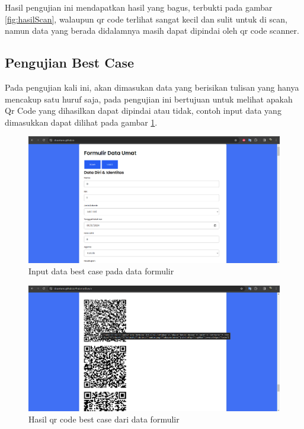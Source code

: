 Hasil pengujian ini mendapatkan hasil yang bagus, terbukti pada gambar \ref{fig:hasilScan}, walaupun qr code terlihat sangat kecil dan sulit untuk di scan, namun data yang berada didalamnya masih dapat dipindai oleh qr code scanner.

\subsection{Pengujian Best Case}
\label{sec:pengujianBest}

Pada pengujian kali ini, akan dimasukan data yang berisikan tulisan yang hanya mencakup satu huruf saja, pada pengujian ini bertujuan untuk melihat apakah Qr Code yang dihasilkan dapat dipindai atau tidak, contoh input data yang dimasukkan dapat dilihat pada gambar \ref{fig:inputBestCase}.

\begin{figure}[H]
	\centering
	\includegraphics[scale=0.4]{Gambar/inputBestCase.png}
	\caption{Input data best case pada data formulir} 
	\label{fig:inputBestCase}
\end{figure}

\begin{figure}[H]
	\centering
	\includegraphics[scale=0.4]{Gambar/best1.png}
	\caption{Hasil qr code best case dari data formulir} 
	\label{fig:qrCodeBestCase1}
\end{figure}

